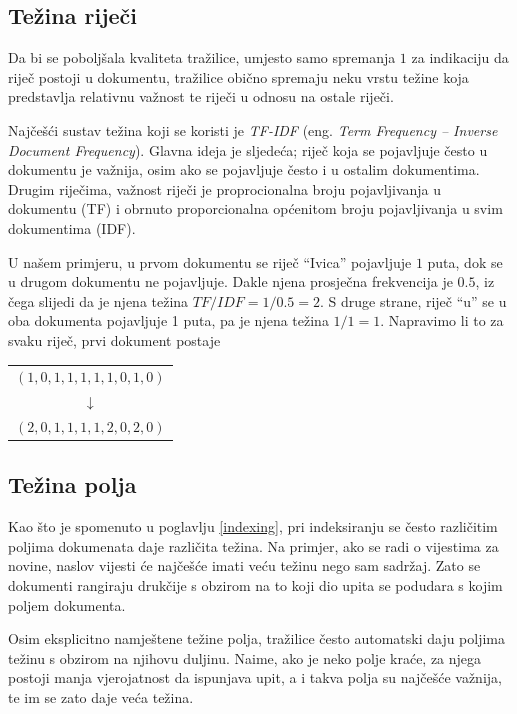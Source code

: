 \documentclass[a4paper,twoside,12pt]{scrreprt}
\newenvironment{nscenter}
 {\par\nopagebreak\centering}
 {\parskip=0pt\par\noindent\ignorespacesafterend}
\begin{document}
\subsection{Težina riječi}
\label{tfidf}

Da bi se poboljšala kvaliteta tražilice, umjesto samo spremanja $1$ za indikaciju da riječ postoji u dokumentu, tražilice obično spremaju neku vrstu težine koja predstavlja relativnu važnost te riječi u odnosu na ostale riječi.

Najčešći sustav težina koji se koristi je \textit{TF-IDF} (eng. \textit{Term Frequency – Inverse Document Frequency}). Glavna ideja je sljedeća; riječ koja se pojavljuje često u dokumentu je važnija, osim ako se pojavljuje često i u ostalim dokumentima. Drugim riječima, važnost riječi je proprocionalna broju pojavljivanja u dokumentu (TF) i obrnuto proporcionalna općenitom broju pojavljivanja u svim dokumentima (IDF).

U našem primjeru, u prvom dokumentu se riječ ``Ivica'' pojavljuje $1$ puta, dok se u drugom dokumentu ne pojavljuje. Dakle njena prosječna frekvencija je $0.5$, iz čega slijedi da je njena težina $TF / IDF = 1 / 0.5 = 2$. S druge strane, riječ ``u'' se u oba dokumenta pojavljuje 1 puta, pa je njena težina $1 / 1 = 1$. Napravimo li to za svaku riječ, prvi dokument postaje

\begin{nscenter}
  \begin{tabular}{c}
    $(1,0,1,1,1,1,1,0,1,0)$ \\
    $\downarrow$            \\
    $(2,0,1,1,1,1,2,0,2,0)$ \\
  \end{tabular}
\end{nscenter}

\subsection{Težina polja}

Kao što je spomenuto u poglavlju \ref{indexing}, pri indeksiranju se često različitim poljima dokumenata daje različita težina. Na primjer, ako se radi o vijestima za novine, naslov vijesti će najčešće imati veću težinu nego sam sadržaj. Zato se dokumenti rangiraju drukčije s obzirom na to koji dio upita se podudara s kojim poljem dokumenta.

Osim eksplicitno namještene težine polja, tražilice često automatski daju poljima težinu s obzirom na njihovu duljinu. Naime, ako je neko polje kraće, za njega postoji manja vjerojatnost da ispunjava upit, a i takva polja su najčešće važnija, te im se zato daje veća težina.
\end{document}
